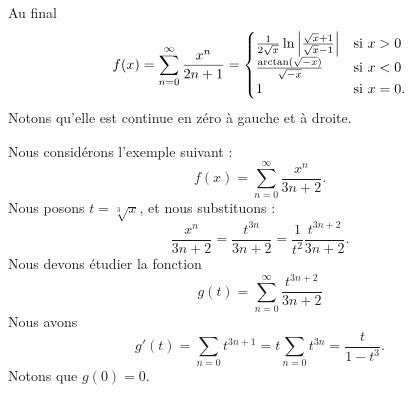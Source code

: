 \begin{example}
    Au final
    \begin{equation}        \label{EqIHlDjG}
        f(x)=\sum_{n=0}^{\infty}\frac{ x^n }{ 2n+1 }=\begin{cases}
            \frac{ 1 }{2\sqrt{x}}\ln\left| \frac{ \sqrt{x}+1 }{ \sqrt{x}-1 } \right|     &   \text{si \( x>0\)}\\
            \frac{ \arctan(\sqrt{-x}) }{ \sqrt{-x} }    &    \text{si \( x<0\)}\\
            1   &\text{si \( x=0\)}.
        \end{cases}
    \end{equation}
    Notons qu'elle est continue en zéro à gauche et à droite.

\end{example}

\begin{example}
Nous considérons l'exemple suivant :
\begin{equation}
    f(x)=\sum_{n=0}^{\infty}\frac{ x^n }{ 3n+2 }.
\end{equation}
Nous posons \( t=\sqrt[3]{x}\), et nous substituons :
\begin{equation}
    \frac{ x^n }{ 3n+2 }=\frac{ t^{3n} }{ 3n+2 }=\frac{1}{ t^2 }\frac{ t^{3n+2} }{ 3n+2 }.
\end{equation}
Nous devons étudier la fonction
\begin{equation}
    g(t)=\sum_{n=0}^{\infty}\frac{ t^{3n+2} }{ 3n+2 }
\end{equation}
Nous avons
\begin{equation}
    g'(t)=\sum_{n=0}t^{3n+1}=t\sum_{n=0}t^{3n}=\frac{ t }{ 1-t^3 }.
\end{equation}
Notons que \( g(0)=0\). 
\end{example}

